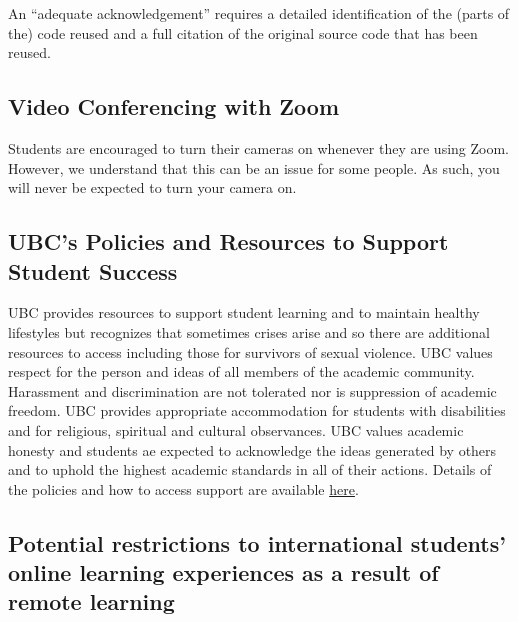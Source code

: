 \documentclass[
]{article}
\begin{document}
An ``adequate acknowledgement'' requires a detailed identification of
the (parts of the) code reused and a full citation of the original
source code that has been reused.

\hypertarget{video-conferencing-with-zoom}{%
\subsection{Video Conferencing with
Zoom}\label{video-conferencing-with-zoom}}

Students are encouraged to turn their cameras on whenever they are using
Zoom. However, we understand that this can be an issue for some people.
As such, you will never be expected to turn your camera on.

\hypertarget{ubcs-policies-and-resources-to-support-student-success}{%
\subsection{UBC's Policies and Resources to Support Student
Success}\label{ubcs-policies-and-resources-to-support-student-success}}

UBC provides resources to support student learning and to maintain
healthy lifestyles but recognizes that sometimes crises arise and so
there are additional resources to access including those for survivors
of sexual violence. UBC values respect for the person and ideas of all
members of the academic community. Harassment and discrimination are not
tolerated nor is suppression of academic freedom. UBC provides
appropriate accommodation for students with disabilities and for
religious, spiritual and cultural observances. UBC values academic
honesty and students ae expected to acknowledge the ideas generated by
others and to uphold the highest academic standards in all of their
actions. Details of the policies and how to access support are available
\href{https://senate.ubc.ca/policies-resources-support-student-success}{here}.

\hypertarget{potential-restrictions-to-international-students-online-learning-experiences-as-a-result-of-remote-learning}{%
\subsection{Potential restrictions to international students' online
learning experiences as a result of remote
learning}\label{potential-restrictions-to-international-students-online-learning-experiences-as-a-result-of-remote-learning}}
\end{document}
